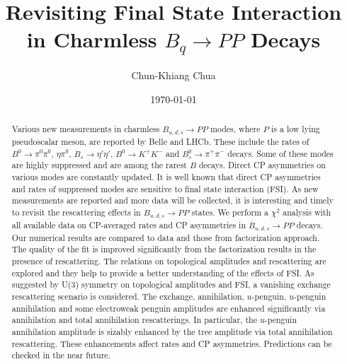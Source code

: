 \documentclass[aps,preprint,floats,epsf,epsfig,nofootinbib,letter]{revtex4}
\begin{document}
\title{Revisiting Final State Interaction in Charmless $B_q\to P P$ Decays}
%

\author{Chun-Khiang Chua}


\date{\today}

\begin{abstract}


Various new measurements in charmless $B_{u,d,s}\to PP$ modes, where $P$ is a low lying pseudoscalar meson, are reported by Belle and LHCb. These include the rates of $B^0\to\pi^0\pi^0$, $\eta\pi^0$, $B_s\to\eta'\eta'$,  $B^0\to K^+K^-$ and $B^0_s\to\pi^+\pi^-$ decays. Some of these modes are highly suppressed and are among the rarest $B$ decays. Direct CP asymmetries on various modes are constantly updated. It is well known that direct CP asymmetries and rates of suppressed modes are sensitive to final state interaction (FSI). As new measurements are reported and more data will be collected, it is interesting and timely to revisit the rescattering effects in $B_{u,d,s}\to PP$ states. We perform a $\chi^2$ analysis with all available data on CP-averaged rates and CP asymmetries in $\overline B{}_{u,d,s}\to PP$ decays. Our numerical results are compared to data and those from factorization approach. The quality of the fit is improved significantly from the factorization results in the presence of rescattering. The relations on topological amplitudes and rescattering are explored and they help to provide a better understanding of the effects of FSI. As suggested by U(3) symmetry on topological amplitudes and FSI, a vanishing exchange rescattering scenario is considered. The exchange, annihilation, $u$-penguin, $u$-penguin annihilation and some electroweak penguin amplitudes are enhanced significantly via annihilation and total annihilation rescatterings. In particular, the $u$-penguin annihilation amplitude is sizably enhanced by the tree amplitude via total annihilation rescattering. These enhancements affect rates and CP asymmetries. Predictions can be checked in the near future.

 \end{abstract}
\end{document}
